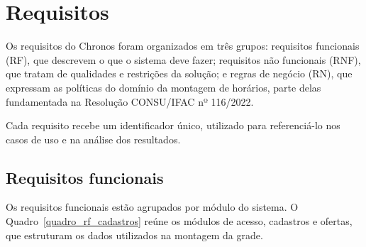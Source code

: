 %
%

\section{Requisitos}
\label{sub_cap_requis}

Os requisitos do Chronos foram organizados em três grupos: requisitos funcionais (RF), que descrevem o que o sistema deve fazer; requisitos não funcionais (RNF), que tratam de qualidades e restrições da solução; e regras de negócio (RN), que expressam as políticas do domínio da montagem de horários, parte delas fundamentada na Resolução CONSU/IFAC nº 116/2022.

Cada requisito recebe um identificador único, utilizado para referenciá-lo nos casos de uso e na análise dos resultados.

\subsection{Requisitos funcionais}
\label{sub_cap_requis_func}

Os requisitos funcionais estão agrupados por módulo do sistema. O Quadro~\ref{quadro_rf_cadastros} reúne os módulos de acesso, cadastros e ofertas, que estruturam os dados utilizados na montagem da grade.


